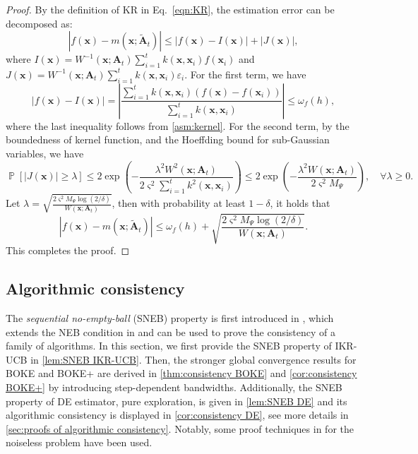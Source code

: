 \documentclass[11pt,en]{elegantpaper}
\newcommand{\x}{\bm{x}}
\newcommand{\A}{\bm{A}}
\newcommand{\1}{\mathds{1}}
\DeclareMathOperator*{\Prob}{\mathbb{P}}
\begin{document}
\begin{proof}
    By the definition of KR in Eq.~\eqref{eqn:KR}, the estimation error can be decomposed as:
    \[
        |f(\x) - m(\x; \tilde{\A}_t)| \le |f(\x) - I(\x)| + |J(\x)|,
    \]
    where $I(\x) = W^{-1}(\x; \A_t) \sum_{i=1}^{t} k(\x, \x_i) f(\x_i)$ and $J(\x) = W^{-1}(\x; \A_t) \sum_{i=1}^{t} k(\x, \x_i) \varepsilon_i$.
    For the first term, we have
    \[
        |f(\x) - I(\x)|
        = \left| \dfrac{\sum_{i=1}^{t} k(\x, \x_i) (f(\x) - f(\x_i))}{\sum_{i=1}^{t} k(\x, \x_i)} \right|
        \le \omega_f(h),
    \]
    where the last inequality follows from \cref{asm:kernel}.
    For the second term, by the boundedness of kernel function, and the Hoeffding bound for sub-Gaussian variables, we have
    \[
        \Prob \left[ |J(\x)| \ge \lambda \right]
        \le 2 \exp \left( - \dfrac{\lambda^2 W^2(\x; \A_t)}{2 \varsigma^2 \sum_{i=1}^{t} k^2(\x, \x_i)} \right)
        \le 2 \exp \left( - \dfrac{\lambda^2 W(\x; \A_t)}{2 \varsigma^2 M_{\Psi}} \right),
        \quad \forall \lambda \ge 0.
    \]
    Let $\lambda = \sqrt{\frac{2 \varsigma^2 M_{\Psi} \log(2/\delta)}{W(\x; \A_t)}}$, then with probability at least $1 - \delta$, it holds that
    \[
        |f(\x) - m(\x; \tilde{\A}_t)| \le \omega_f(h) + \sqrt{\dfrac{2 \varsigma^2 M_{\Psi} \log(2/\delta)}{W(\x; \A_t)}}.
    \]
    This completes the proof.
\end{proof}




\subsection{Algorithmic consistency}
\label{sec:algorithmic consistency}

The \textit{sequential no-empty-ball} (SNEB) property is first introduced in \cite{chen2024pseudo}, which extends the NEB condition in \cite{vazquez2010convergence} and can be used to prove the consistency of a family of algorithms.
In this section, we first provide the SNEB property of IKR-UCB in \cref{lem:SNEB IKR-UCB}. Then, the stronger global convergence results for BOKE and BOKE+ are derived in \cref{thm:consistency BOKE} and \cref{cor:consistency BOKE+} by introducing step-dependent bandwidths. Additionally, the SNEB property of DE estimator, pure exploration, is given in \cref{lem:SNEB DE} and its algorithmic consistency is displayed in \cref{cor:consistency DE}, see more details in \cref{sec:proofs of algorithmic consistency}.
Notably, some proof techniques in \cite{chen2024pseudo, previtali2023glisp} for the noiseless problem have been used.
\end{document}
